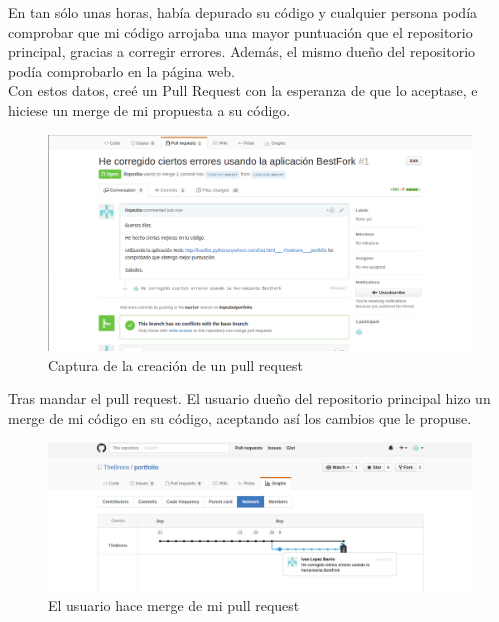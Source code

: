 \documentclass[a4paper, 12pt]{book}
\begin{document}
En tan sólo unas horas, había depurado su código y cualquier persona podía comprobar que mi código arrojaba una mayor puntuación que el repositorio principal, gracias a corregir errores. Además, el mismo dueño del repositorio podía comprobarlo en la página web.\\
Con estos datos, creé un Pull Request con la esperanza de que lo aceptase, e hiciese un merge de mi propuesta a su código.

\begin{figure}[H]
\centering
\includegraphics[scale=0.35]{img/pullrequest1.png} 
\caption{Captura de la creación de un pull request}
\end{figure}

Tras mandar el pull request. El usuario dueño del repositorio principal hizo un merge de mi código en su código, aceptando así los cambios que le propuse.
\begin{figure}[H]
\centering
\includegraphics[scale=0.35]{img/merge1.png} 
\caption{El usuario hace merge de mi pull request}
\end{figure}
\end{document}
